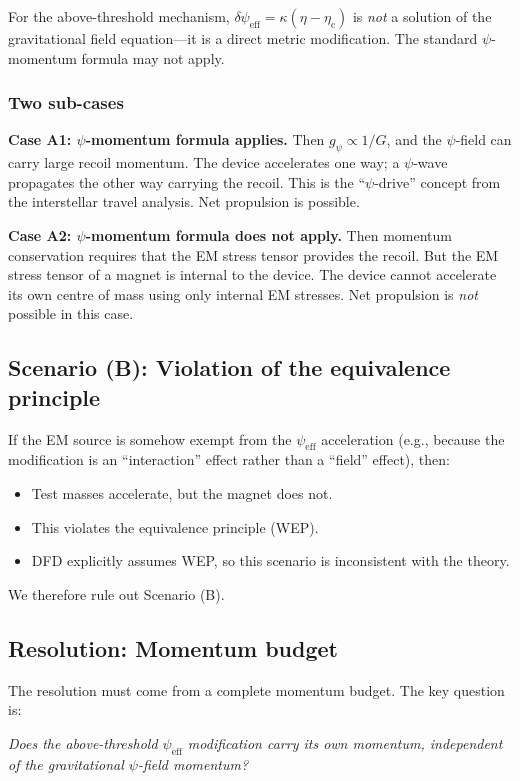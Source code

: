 \documentclass[12pt,a4paper]{article}
\newcommand{\psieff}{\psi_{\mathrm{eff}}}
\newcommand{\etac}{\eta_{\mathrm{c}}}
\begin{document}
For the above-threshold mechanism, $\delta\psieff = \kappa(\eta - \etac)$ is \emph{not} a solution of the
gravitational field equation---it is a direct metric modification. The standard $\psi$-momentum formula
may not apply.

\subsubsection{Two sub-cases}

\textbf{Case A1: $\psi$-momentum formula applies.} Then $g_\psi \propto 1/G$, and the $\psi$-field can
carry large recoil momentum. The device accelerates one way; a $\psi$-wave propagates the other way
carrying the recoil. This is the ``$\psi$-drive'' concept from the interstellar travel analysis.
Net propulsion is possible.

\textbf{Case A2: $\psi$-momentum formula does not apply.} Then momentum conservation requires that the
EM stress tensor provides the recoil. But the EM stress tensor of a magnet is internal to the device.
The device cannot accelerate its own centre of mass using only internal EM stresses. Net propulsion
is \emph{not} possible in this case.

\subsection{Scenario (B): Violation of the equivalence principle}

If the EM source is somehow exempt from the $\psieff$ acceleration (e.g., because the modification is an
``interaction'' effect rather than a ``field'' effect), then:
\begin{itemize}
\item Test masses accelerate, but the magnet does not.
\item This violates the equivalence principle (WEP).
\item DFD explicitly assumes WEP, so this scenario is inconsistent with the theory.
\end{itemize}
We therefore rule out Scenario (B).

\subsection{Resolution: Momentum budget}

The resolution must come from a complete momentum budget. The key question is:

\emph{Does the above-threshold $\psieff$ modification carry its own momentum, independent of the
gravitational $\psi$-field momentum?}
\end{document}
